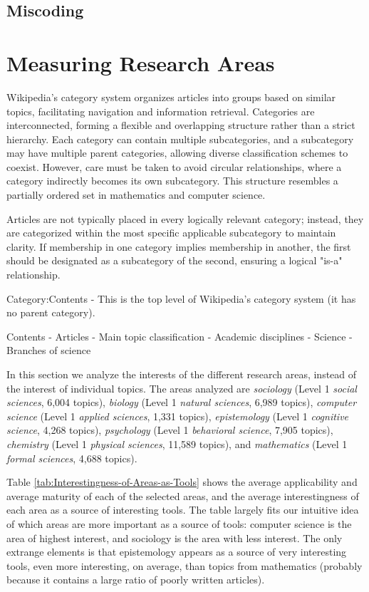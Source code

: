 \subsection{Miscoding}

%
%
\section{Measuring Research Areas}

Wikipedia's category system organizes articles into groups based on similar topics, facilitating navigation and information retrieval. Categories are interconnected, forming a flexible and overlapping structure rather than a strict hierarchy. Each category can contain multiple subcategories, and a subcategory may have multiple parent categories, allowing diverse classification schemes to coexist. However, care must be taken to avoid circular relationships, where a category indirectly becomes its own subcategory. This structure resembles a partially ordered set in mathematics and computer science. 

Articles are not typically placed in every logically relevant category; instead, they are categorized within the most specific applicable subcategory to maintain clarity. If membership in one category implies membership in another, the first should be designated as a subcategory of the second, ensuring a logical "is-a" relationship.

Category:Contents - This is the top level of Wikipedia's category system (it has no parent category).

Contents - Articles - Main topic classification - Academic disciplines - Science - Branches of science


In this section we analyze the interests of the different research areas, instead of the interest of individual topics. The areas analyzed are \emph{sociology} (Level 1 \emph{social sciences}, 6,004 topics),
\emph{biology} (Level 1 \emph{natural sciences}, 6,989 topics), \emph{computer science} (Level 1 \emph{applied sciences}, 1,331 topics), \emph{epistemology} (Level 1 \emph{cognitive science}, 4,268 topics), \emph{psychology} (Level 1 \emph{behavioral science}, 7,905 topics), \emph{chemistry} (Level 1 \emph{physical sciences}, 11,589 topics), and \emph{mathematics} (Level 1 \emph{formal sciences}, 4,688 topics).

Table \ref{tab:Interestingness-of-Areas-as-Tools} shows the average applicability and average maturity of each of the selected areas, and the average interestingness of each area as a source of interesting tools. The table largely fits our intuitive idea of which areas are more important as a source of tools: computer science is the area of highest interest, and sociology is the area with less interest. The only extrange elements is that epistemology appears as a source of very interesting tools, even more interesting, on average, than topics from mathematics (probably because it contains a large ratio of poorly written articles).

